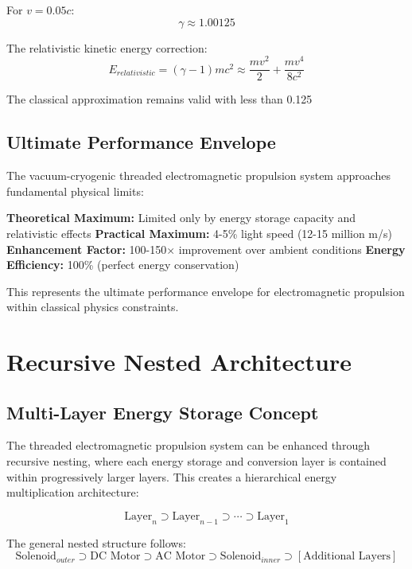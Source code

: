 \documentclass[12pt,a4paper]{article}
\begin{document}
For $v = 0.05c$:
\begin{equation}
\gamma \approx 1.00125
\end{equation}

The relativistic kinetic energy correction:
\begin{equation}
E_{relativistic} = (\gamma - 1)mc^2 \approx \frac{mv^2}{2} + \frac{mv^4}{8c^2}
\end{equation}

The classical approximation remains valid with less than 0.125%

\subsection{Ultimate Performance Envelope}

The vacuum-cryogenic threaded electromagnetic propulsion system approaches fundamental physical limits:

\textbf{Theoretical Maximum:} Limited only by energy storage capacity and relativistic effects
\textbf{Practical Maximum:} 4-5\% light speed (12-15 million m/s)
\textbf{Enhancement Factor:} 100-150× improvement over ambient conditions
\textbf{Energy Efficiency:} 100\% (perfect energy conservation)

This represents the ultimate performance envelope for electromagnetic propulsion within classical physics constraints.

\section{Recursive Nested Architecture}

\subsection{Multi-Layer Energy Storage Concept}

The threaded electromagnetic propulsion system can be enhanced through recursive nesting, where each energy storage and conversion layer is contained within progressively larger layers. This creates a hierarchical energy multiplication architecture:

\begin{equation}
\text{Layer}_n \supset \text{Layer}_{n-1} \supset \cdots \supset \text{Layer}_1
\end{equation}

The general nested structure follows:
\begin{equation}
\text{Solenoid}_{outer} \supset \text{DC Motor} \supset \text{AC Motor} \supset \text{Solenoid}_{inner} \supset [\text{Additional Layers}]
\end{equation}
\end{document}
